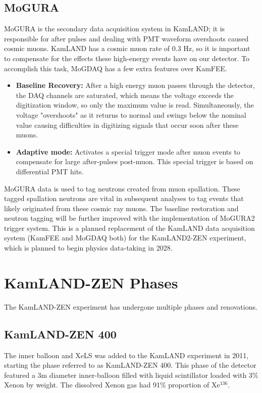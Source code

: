 \subsection{MoGURA}
MoGURA is the secondary data acquisition system in KamLAND; it is responsible for after pulses and dealing with PMT waveform overshoots caused cosmic muons. KamLAND has a cosmic muon rate of 0.3 Hz, so it is important to compensate for the effects these high-energy events have on our detector. To accomplish this task, MoGDAQ has a few extra features over KamFEE.
\begin{itemize}
	\item \textbf{Baseline Recovery:} After a high energy muon passes through the detector, the DAQ channels are saturated, which means the voltage exceeds the digitization window, so only the maximum value is read. Simultaneously, the voltage "overshoots" as it returns to normal and swings below the nominal value causing difficulties in digitizing signals that occur soon after these muons. 
	\item \textbf{Adaptive mode:} Activates a special trigger mode after muon events to compensate for large after-pulses post-muon. This special trigger is based on differential PMT hits. 
\end{itemize}

MoGURA data is used to tag neutrons created from muon spallation. These tagged spallation neutrons are vital in subsequent analyses to tag events that likely originated from these cosmic ray muons. The baseline restoration and neutron tagging will be further improved with the implementation of MoGURA2 trigger system. This is a planned replacement of the KamLAND data acquisition system (KamFEE and MoGDAQ both) for the KamLAND2-ZEN experiment, which is planned to begin physics data-taking in 2028.

\section{KamLAND-ZEN Phases}
The KamLAND-ZEN experiment has undergone multiple phases and renovations.
\subsection{KamLAND-ZEN 400}
The inner balloon and XeLS was added to the KamLAND experiment in 2011, starting the phase referred to as KamLAND-ZEN 400. This phase of the detector featured a 3m diameter inner-balloon filled with liquid scintillator loaded with 3\% Xenon by weight. The dissolved Xenon gas had 91\% proportion of Xe$^{136}$.

